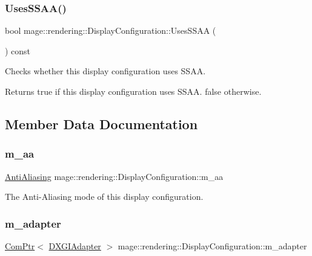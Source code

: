\subsubsection{\texorpdfstring{Uses\+S\+S\+A\+A()}{UsesSSAA()}}
{\footnotesize\ttfamily bool mage\+::rendering\+::\+Display\+Configuration\+::\+Uses\+S\+S\+AA (\begin{DoxyParamCaption}{ }\end{DoxyParamCaption}) const\hspace{0.3cm}{\ttfamily [noexcept]}}

Checks whether this display configuration uses S\+S\+AA.

\begin{DoxyReturn}{Returns}
{\ttfamily true} if this display configuration uses S\+S\+AA. {\ttfamily false} otherwise. 
\end{DoxyReturn}


\subsection{Member Data Documentation}
\hypertarget{classmage_1_1rendering_1_1_display_configuration_a03754a6d492393f70f68c619311dfa4c}{}\label{classmage_1_1rendering_1_1_display_configuration_a03754a6d492393f70f68c619311dfa4c} 
\subsubsection{\texorpdfstring{m\+\_\+aa}{m\_aa}}
{\footnotesize\ttfamily \hyperlink{namespacemage_1_1rendering_ac3f75e49e92b42f2f5fb55c450d8899c}{Anti\+Aliasing} mage\+::rendering\+::\+Display\+Configuration\+::m\+\_\+aa\hspace{0.3cm}{\ttfamily [private]}}

The Anti-\/\+Aliasing mode of this display configuration. \hypertarget{classmage_1_1rendering_1_1_display_configuration_a307a8e6e0b1beb93175a6db519759e86}{}\label{classmage_1_1rendering_1_1_display_configuration_a307a8e6e0b1beb93175a6db519759e86} 
\subsubsection{\texorpdfstring{m\+\_\+adapter}{m\_adapter}}
{\footnotesize\ttfamily \hyperlink{namespacemage_ae74f374780900893caa5555d1031fd79}{Com\+Ptr}$<$ \hyperlink{namespacemage_1_1rendering_ad55e028ebd705b547eeb972ad8d03b6a}{D\+X\+G\+I\+Adapter} $>$ mage\+::rendering\+::\+Display\+Configuration\+::m\+\_\+adapter\hspace{0.3cm}{\ttfamily [private]}}

